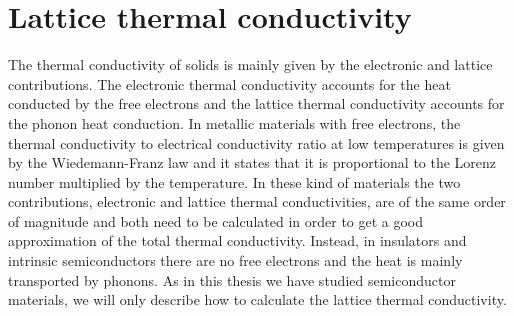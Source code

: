 
\chapter{Lattice thermal conductivity} %

\label{Chapter4} %


The thermal conductivity of solids is mainly given by the electronic and lattice contributions\cite{tritt2005thermal}. The electronic thermal conductivity accounts for the heat conducted by the free 
electrons and the lattice thermal conductivity accounts for the phonon heat conduction. In metallic materials with free electrons, the thermal conductivity to electrical conductivity ratio at low temperatures is given by the 
Wiedemann-Franz law and it states that it is proportional to the Lorenz number multiplied by the temperature\cite{ashcroft1976solid}. In these kind of materials the two contributions, electronic and lattice thermal conductivities, are 
of the same order of magnitude and both need to be calculated in order to get a good approximation of the total 
thermal conductivity. Instead, in insulators and  intrinsic semiconductors there are no free electrons and the 
heat is mainly transported by phonons. As in this thesis we have studied semiconductor materials, we will only describe how to calculate the lattice thermal conductivity. \\
 
